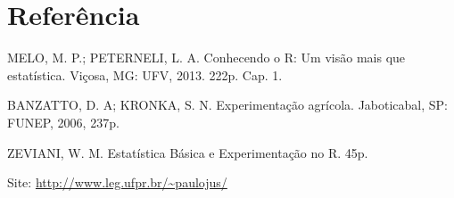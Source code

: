 \documentclass[
]{book}
\begin{document}
\hypertarget{referuxeancia-4}{%
\section{Referência}\label{referuxeancia-4}}

MELO, M. P.; PETERNELI, L. A. Conhecendo o R: Um visão mais que estatística. Viçosa, MG: UFV, 2013. 222p. Cap. 1.

BANZATTO, D. A; KRONKA, S. N. Experimentação agrícola. Jaboticabal, SP: FUNEP, 2006, 237p.

ZEVIANI, W. M. Estatística Básica e Experimentação no R. 45p.

Site: \url{http://www.leg.ufpr.br/~paulojus/}

  
\end{document}
